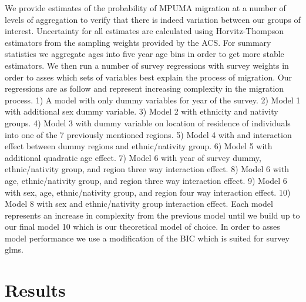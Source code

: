 \documentclass[fleqn,12pt]{olplainarticle}
\begin{document}
We provide estimates of the probability of MPUMA migration at a number of levels of aggregation to verify that there is indeed variation between our groups of interest. Uncertainty for all estimates are calculated using Horvitz-Thompson estimators from the sampling weights provided by the ACS. For summary statistics we aggregate ages into five year age bins in order to get more stable estimators. We then run a number of survey regressions with survey weights in order to asses which sets of variables best explain the process of migration. Our regressions are as follow and represent increasing complexity in the migration process. 1) A model with only dummy variables for year of the survey. 2) Model 1 with additional sex dummy variable. 3) Model 2 with ethnicity and nativity groups. 4) Model 3 with dummy variable on location of residence of individuals into one of the 7 previously mentioned regions. 5) Model 4 with and interaction effect between dummy regions and ethnic/nativity group. 6) Model 5 with additional quadratic age effect. 7) Model 6 with year of survey dummy, ethnic/nativity group, and region three way interaction effect. 8) Model 6 with age, ethnic/nativity group, and region three way interaction effect. 9) Model 6 with sex, age, ethnic/nativity group, and region four way interaction effect. 10) Model 8 with sex and ethnic/nativity group interaction effect. Each model represents an increase in complexity from the previous model until we build up to our final model 10 which is our theoretical model of choice. In order to asses model performance we use a modification of the BIC which is suited for survey glms.  

\section*{Results}



\end{document}
